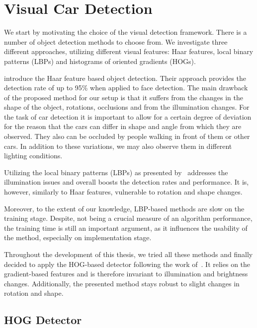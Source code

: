 
\section{Visual Car Detection} %
\label{sec:perception}

We start by motivating the choice of the visual detection framework. There is
a number of object detection methods to choose from. We investigate three
different approaches, utilizing different visual features: Haar features,
local binary patterns (LBPs) and histograms of oriented gradients (HOGs).

\citet{violajones2001} introduce the Haar feature based object detection.
Their approach provides the detection rate of up to 95\% when applied to face
detection. The main drawback of the proposed method for our setup is that it
suffers from the changes in the shape of the object, rotations, occlusions and
from the illumination changes. For the task of car detection it is important
to allow for a certain degree of deviation for the reason that the cars can
differ in shape and angle from which they are observed. They also can be
occluded by people walking in front of them or other cars. In addition to
these variations, we may also observe them in different lighting conditions.

Utilizing the local binary patterns (LBPs) as presented by~\citet{lbp2010}
addresses the illumination issues and overall boosts the detection rates and
performance. It is, however, similarly to Haar features, vulnerable to
rotation and shape changes.

Moreover, to the extent of our knowledge, LBP-based methods are slow on the
training stage. Despite, not being a crucial measure of an algorithm
performance, the training time is still an important argument, as it
influences the usability of the method, especially on implementation stage.

Throughout the development of this thesis, we tried all these methods and
finally decided to apply the HOG-based detector following the work
of~\citet{dalal2005}. It relies on the gradient-based features and is
therefore invariant to illumination and brightness changes. Additionally, the
presented method stays robust to slight changes in rotation and shape.

\subsection{HOG Detector}\label{sub:hog_detector}

